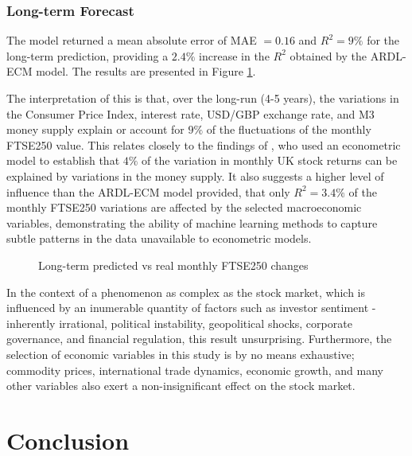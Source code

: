 \documentclass[11pt,a4paper]{article}
\newcommand{\citeboth}[1]{\citeauthor{#1} \citep{#1}}
\begin{document}
\subsubsection{Long-term Forecast}
The model returned a mean absolute error of MAE $=0.16$ and 
$R^2 = 9\%$ for the long-term prediction, providing a 
$2.4\%$ increase in the $R^2$ obtained by the ARDL-ECM model. The results are presented 
in Figure \ref{fig:longmonthly}.

The interpretation of this is that, over the long-run (4-5 years), the variations in the 
Consumer Price Index, interest rate, USD/GBP exchange rate, and M3 money 
supply explain or account for $9\%$ of the fluctuations of the
monthly FTSE250 value. This relates closely to the findings of \citeboth{conover1999}, 
who used an econometric model to establish that $4\%$ of the variation in monthly UK stock returns can be 
explained by variations in the money supply. It also suggests a higher level of influence 
than the ARDL-ECM model provided, that only $R^2=3.4\%$ of the monthly FTSE250 variations 
are affected by the selected macroeconomic variables, demonstrating the ability of machine learning
methods to capture subtle patterns in the data unavailable to econometric models. 

\begin{figure}[H]
    \centering
    \hspace*{-1.5cm}
      
    \caption{Long-term predicted vs real monthly FTSE250 changes}
    \label{fig:longmonthly}
\end{figure}



In the context of a phenomenon as complex as the stock market,
which is influenced by an inumerable quantity of factors such as investor sentiment
- inherently irrational, 
political instability, geopolitical shocks, corporate governance, and financial regulation, this result 
unsurprising. Furthermore, the selection of economic variables in this study
is by no means exhaustive; commodity prices, international trade dynamics,
economic growth, and many other variables also exert a non-insignificant 
effect on the stock market.


\section{Conclusion}
\label{sec: conc}
\end{document}
